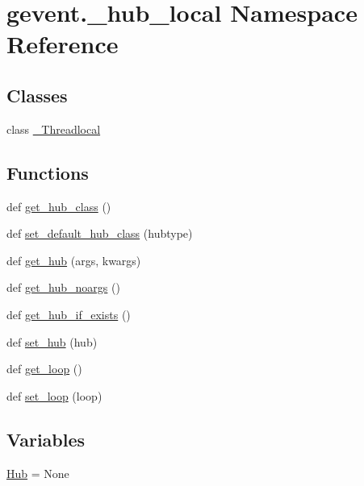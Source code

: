\hypertarget{namespacegevent_1_1__hub__local}{}\section{gevent.\+\_\+hub\+\_\+local Namespace Reference}
\label{namespacegevent_1_1__hub__local}
\subsection*{Classes}
\begin{DoxyCompactItemize}
\item 
class \hyperlink{classgevent_1_1__hub__local_1_1___threadlocal}{\+\_\+\+Threadlocal}
\end{DoxyCompactItemize}
\subsection*{Functions}
\begin{DoxyCompactItemize}
\item 
def \hyperlink{namespacegevent_1_1__hub__local_acacad317cf51bfe0ff35af66c0a8f250}{get\+\_\+hub\+\_\+class} ()
\item 
def \hyperlink{namespacegevent_1_1__hub__local_a9df8e5d37c4bbe89e25a255552fc2ced}{set\+\_\+default\+\_\+hub\+\_\+class} (hubtype)
\item 
def \hyperlink{namespacegevent_1_1__hub__local_a59904c4b0aa4fc2b50908b46d5be8c7d}{get\+\_\+hub} (args, kwargs)
\item 
def \hyperlink{namespacegevent_1_1__hub__local_a4ef27cece08e4f51548c6a6df77d2d25}{get\+\_\+hub\+\_\+noargs} ()
\item 
def \hyperlink{namespacegevent_1_1__hub__local_ad07e189422219cd7d11212e82bdf3cbe}{get\+\_\+hub\+\_\+if\+\_\+exists} ()
\item 
def \hyperlink{namespacegevent_1_1__hub__local_a2bcd8fa51b01bbd99af50ddc19207ff9}{set\+\_\+hub} (hub)
\item 
def \hyperlink{namespacegevent_1_1__hub__local_a4703c15820001f10ba72698526bd3107}{get\+\_\+loop} ()
\item 
def \hyperlink{namespacegevent_1_1__hub__local_a2acfeff2d0f023ffff379843d6b67201}{set\+\_\+loop} (loop)
\end{DoxyCompactItemize}
\subsection*{Variables}
\begin{DoxyCompactItemize}
\item 
\hyperlink{namespacegevent_1_1__hub__local_a8a84f38e9c455d96fb40f319aa32e91c}{Hub} = None
\end{DoxyCompactItemize}


